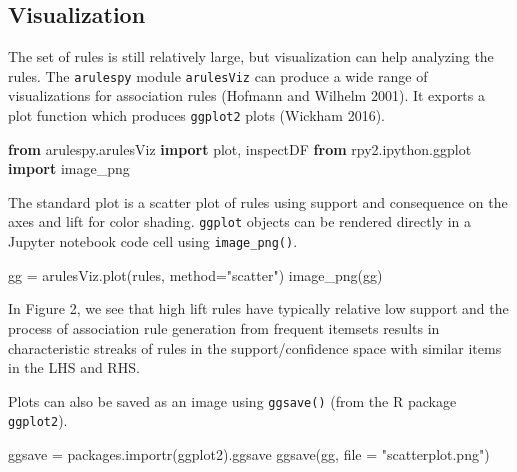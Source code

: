 \documentclass{article}
\newenvironment{Shaded}{}{}
\newcommand{\BuiltInTok}[1]{\textcolor[rgb]{0.00,0.50,0.00}{#1}}
\newcommand{\ImportTok}[1]{\textcolor[rgb]{0.00,0.50,0.00}{\textbf{#1}}}
\newcommand{\NormalTok}[1]{#1}
\newcommand{\OperatorTok}[1]{\textcolor[rgb]{0.40,0.40,0.40}{#1}}
\newcommand{\StringTok}[1]{\textcolor[rgb]{0.25,0.44,0.63}{#1}}
\begin{document}
\hypertarget{visualization}{%
\subsection{Visualization}\label{visualization}}

The set of rules is still relatively large, but visualization can help
analyzing the rules. The \texttt{arulespy} module \texttt{arulesViz} can
produce a wide range of visualizations for association rules (Hofmann
and Wilhelm 2001). It exports a plot function which produces
\texttt{ggplot2} plots (Wickham 2016).

\begin{Shaded}
\begin{Highlighting}[]
\ImportTok{from}\NormalTok{ arulespy.arulesViz }\ImportTok{import}\NormalTok{ plot, inspectDF}
\ImportTok{from}\NormalTok{ rpy2.ipython.ggplot }\ImportTok{import}\NormalTok{ image\_png}
\end{Highlighting}
\end{Shaded}

The standard plot is a scatter plot of rules using support and
consequence on the axes and lift for color shading. \texttt{ggplot}
objects can be rendered directly in a Jupyter notebook code cell using
\texttt{image\_png()}.

\begin{Shaded}
\begin{Highlighting}[]
\NormalTok{gg }\OperatorTok{=}\NormalTok{ arulesViz.plot(rules, method}\OperatorTok{=}\StringTok{"scatter"}\NormalTok{)}
\NormalTok{image\_png(gg)}
\end{Highlighting}
\end{Shaded}

In Figure 2, we see that high lift rules have typically relative low
support and the process of association rule generation from frequent
itemsets results in characteristic streaks of rules in the
support/confidence space with similar items in the LHS and RHS.

Plots can also be saved as an image using \texttt{ggsave()} (from the R
package \texttt{ggplot2}).

\begin{Shaded}
\begin{Highlighting}[]
\NormalTok{ggsave }\OperatorTok{=}\NormalTok{ packages.importr(}\StringTok{\textquotesingle{}ggplot2\textquotesingle{}}\NormalTok{).ggsave}
\NormalTok{ggsave(gg, }\BuiltInTok{file} \OperatorTok{=} \StringTok{"scatterplot.png"}\NormalTok{)}
\end{Highlighting}
\end{Shaded}
\end{document}
